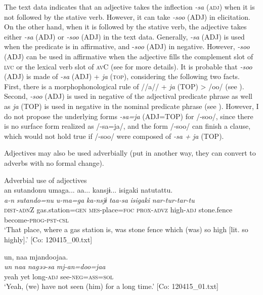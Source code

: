 The text data indicates that an adjective takes the inflection \textit{{}-sa} (\textsc{adj}) when it is not followed by the stative verb. However, it can take \textit{{}-soo} (ADJ) in elicitation. On the other hand, when it is followed by the stative verb, the adjective takes either \textit{{}-sa} (ADJ) or \textit{{}-soo} (ADJ) in the text data. Generally, \textit{{}-sa} (ADJ) is used when the predicate is in affirmative, and -\textit{soo} (ADJ) in negative. However, \textit{{}-soo} (ADJ) can be used in affirmative when the adjective fills the complement slot of \textsc{lvc} or the lexical verb slot of \textsc{av}C (see  for more details). It is probable that \textit{{}-soo} (ADJ) is made of \textit{{}-sa} (ADJ) + \textit{ja} (\textsc{top}), considering the following two facts. First, there is a morphophonological rule of //a// + \textit{ja} (TOP) > /oo/ (see ). Second, \textit{{}-soo} (ADJ) is used in negative of the adjectival predicate phrase as well as \textit{ja} (TOP) is used in negative in the nominal predicate phrase (see ). However, I do not propose the underlying forms \textit{{}-sa=ja} (ADJ=TOP) for /-soo/, since there is no surface form realized as /-sa=ja/, and the form /-soo/ can finish a clause, which would not hold true if /-soo/ were composed of \textit{{}-sa} \textit{+} \textit{ja} (TOP).

Adjectives may also be used adverbially (put in another way, they can convert to adverbs with no formal change).

\ea  Adverbial use of adjectives \label{ex:4.51}
\ea{}\\
\glll    an  {\textbar}sutando{\textbar}nu  umaga...  aa...  kansjɨ...    isigaki  natutattu.\\
      \textit{a-n}  \textit{sutando=nu}  \textit{u-ma=ga}    \textit{ka-nsjɨ}  \textit{taa-sa}  \textit{isigaki}  \textit{nar-tur-tar-tu}\\
      \textsc{dist}-\textsc{adn}Z  gas.station=\textsc{gen}  \textsc{mes}-place=\textsc{foc}    \textsc{prox}-\textsc{advz}    high-\textsc{adj}  stone.fence  become-\textsc{prog}-\textsc{pst}-\textsc{csl}\\
      \glt       ‘That place, where a gas station is, was stone fence which (was) so high [lit. so highly].’ [Co: 120415\_00.txt]

\ex{}%
\glll     {\textbar}un{\textbar},  naa    mjandoojaa.\\
      \textit{un}  \textit{naa}  \textit{nagəə-sa}  \textit{mj-an=doo=jaa}\\
      yeah  yet  long-\textsc{adj}  see-\textsc{neg}=\textsc{ass}=\textsc{sol}\\
      \glt       ‘Yeah, (we) have not seen (him) for a long time.’ [Co: 120415\_01.txt]


